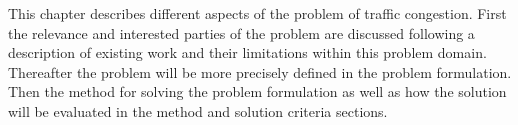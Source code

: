 This chapter describes different aspects of the problem of traffic congestion. First the relevance and interested parties of the problem are discussed following a description of existing work and their limitations within this problem domain. Thereafter the problem will be more precisely defined in the problem formulation. Then the method for solving the problem formulation as well as how the solution will be evaluated in the method and solution criteria sections. 